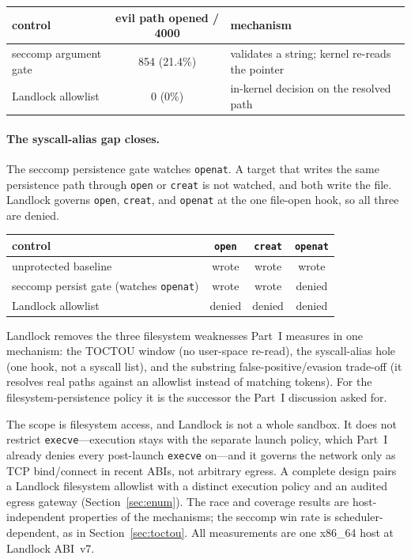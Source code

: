\documentclass[11pt]{article}
\newcommand{\Nrace}{4000}
\newcommand{\RaceHi}{21.4}
\begin{document}
\begin{center}
\begin{tabular}{lcl}
\toprule
control & evil path opened / \Nrace{} & mechanism \\
\midrule
seccomp argument gate & 854 (\RaceHi\%) & validates a string; kernel re-reads the pointer \\
Landlock allowlist & 0 (0\%) & in-kernel decision on the resolved path \\
\bottomrule
\end{tabular}
\end{center}

\paragraph{The syscall-alias gap closes.} The seccomp persistence gate watches \texttt{openat}. A target
that writes the same persistence path through \texttt{open} or \texttt{creat} is not watched, and both
write the file. Landlock governs \texttt{open}, \texttt{creat}, and \texttt{openat} at the one file-open
hook, so all three are denied.

\begin{center}
\begin{tabular}{lccc}
\toprule
control & \texttt{open} & \texttt{creat} & \texttt{openat} \\
\midrule
unprotected baseline & wrote & wrote & wrote \\
seccomp persist gate (watches \texttt{openat}) & wrote & wrote & denied \\
Landlock allowlist & denied & denied & denied \\
\bottomrule
\end{tabular}
\end{center}

Landlock removes the three filesystem weaknesses Part~I measures in one mechanism: the TOCTOU window (no
user-space re-read), the syscall-alias hole (one hook, not a syscall list), and the substring
false-positive/evasion trade-off (it resolves real paths against an allowlist instead of matching tokens).
For the filesystem-persistence policy it is the successor the Part~I discussion asked for.

The scope is filesystem access, and Landlock is not a whole sandbox. It does not restrict
\texttt{execve}---execution stays with the separate launch policy, which Part~I already denies every
post-launch \texttt{execve} on---and it governs the network only as TCP bind/connect in recent ABIs, not
arbitrary egress. A complete design pairs a Landlock filesystem allowlist with a distinct execution policy
and an audited egress gateway (Section~\ref{sec:enum}). The race and coverage results are host-independent
properties of the mechanisms; the seccomp win rate is scheduler-dependent, as in Section~\ref{sec:toctou}.
All measurements are one x86\_64 host at Landlock ABI~v7.
\end{document}
